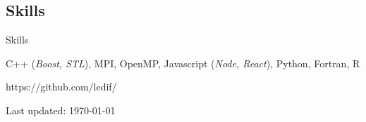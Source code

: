 \documentclass[a4paper,10pt,oneside]{article}
\begin{document}
\begin{body}







\section{Skills}
{Skills}

C++ (\emph{Boost, STL}), MPI, OpenMP, Javascript (\emph{Node, React}), Python, Fortran, R
\par
\EntryGap
https://github.com/ledif/





\EntryGap
\EntryGap
\EntryGap

  \begin{small}
    Last updated: \today
  \end{small}


\end{body}
\end{document}
